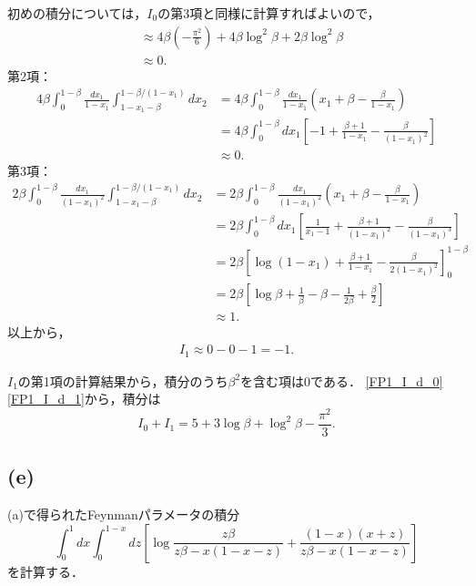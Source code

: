 初めの積分については，$I_0$の第3項と同様に計算すればよいので，
\begin{align*}
  &\approx 4\beta \left( - \frac{\pi^2}{6} \right) + 4\beta\log^2\beta + 2\beta\log^2\beta \\
  &\approx 0 .
\end{align*}
第2項：
\begin{align*}
  4\beta \int_0^{1-\beta} \frac{dx_1}{1-x_1} \int_{1-x_1-\beta}^{1-\beta/(1-x_1)} dx_2
  &= 4\beta \int_0^{1-\beta} \frac{dx_1}{1-x_1} \left( x_1 + \beta - \frac{\beta}{1-x_1} \right) \\
  &= 4\beta \int_0^{1-\beta} dx_1 \left[ -1 + \frac{\beta+1}{1-x_1} - \frac{\beta}{(1-x_1)^2} \right] \\
  &\approx 0 .
\end{align*}
第3項：
\begin{align*}
  2\beta \int_0^{1-\beta} \frac{dx_1}{(1-x_1)^2} \int_{1-x_1-\beta}^{1-\beta/(1-x_1)} dx_2
  &= 2\beta \int_0^{1-\beta} \frac{dx_1}{(1-x_1)^2} \left( x_1 + \beta - \frac{\beta}{1-x_1} \right) \\
  &= 2\beta \int_0^{1-\beta} dx_1 \left[ \frac{1}{x_1 - 1} + \frac{\beta+1}{(1-x_1)^2} - \frac{\beta}{(1-x_1)^3} \right] \\
  &= 2\beta \left[ \log (1 - x_1) + \frac{\beta+1}{1-x_1} - \frac{\beta}{2(1-x_1)^2} \right]_0^{1-\beta} \\
  &= 2\beta \left[ \log\beta + \frac{1}{\beta} - \beta - \frac{1}{2\beta} + \frac{\beta}{2} \right] \\
  &\approx 1 .
\end{align*}
以上から，
\begin{align}
  I_1 \approx 0 - 0 - 1 = -1 . \label{FP1_I_d_1}
\end{align}

$I_1$の第1項の計算結果から，積分のうち$\beta^2$を含む項は$0$である．
\eqref{FP1_I_d_0}\eqref{FP1_I_d_1}から，積分は
\[ I_0 + I_1 = 5 + 3\log\beta + \log^2 \beta - \frac{\pi^2}{3} . \]

\subsection{(e)}
(a)で得られたFeynmanパラメータの積分
\[
\int_0^1 dx \int_0^{1-x} dz \left[ \log \frac{z\beta}{z\beta - x(1-x-z)}
+ \frac{(1-x)(x+z)}{z\beta - x(1-x-z)} \right]
\]
を計算する．

